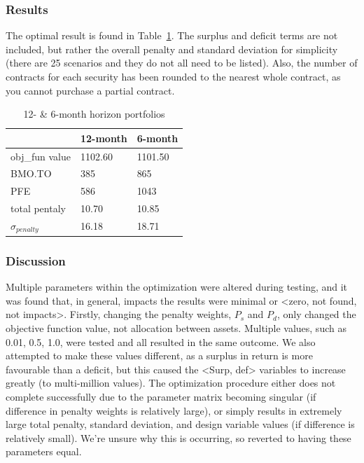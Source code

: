 \documentclass[12pt]{article}
\begin{document}
\subsubsection{Results}
The optimal result is found in Table~\ref{tab:result_pen}.
The surplus and deficit terms are not included, but rather the overall penalty and standard deviation for simplicity (there are 25 scenarios and they do not all need to be listed).
Also, the number of contracts for each security has been rounded to the nearest whole contract, as you cannot purchase a partial contract.

\begin{table}[H]
	\centering
    \begin{tabular}{|l|l|l|}
    \hline
    	~ & \textbf{12-month} & \textbf{6-month} \\ \hline
    	obj\_fun value & 1102.60 & 1101.50 \\ \hline
	BMO.TO & 385 & 865 \\ \hline
	PFE & 586 & 1043 \\ \hline
	total pentaly & 10.70 & 10.85 \\ \hline
	$\sigma_{penalty}$ & 16.18 & 18.71 \\ \hline
    \end{tabular}
    \caption {12- \& 6-month horizon portfolios}
    \label{tab:result_pen}
\end{table}

\subsubsection{Discussion}

Multiple parameters within the optimization were altered during testing, and it was found that, in general, impacts the results were minimal or <zero, not found, not impacts>. Firstly, changing the penalty weights, $P_s$ and $P_d$, only changed the objective function value, not allocation between assets. Multiple values, such as 0.01, 0.5, 1.0, were tested and all resulted in the same outcome. We also attempted to make these values different, as a surplus in return is more favourable than a deficit, but this caused the <Surp, def> variables to increase greatly (to multi-million values). The optimization procedure either does not complete successfully due to the parameter matrix becoming singular (if difference in penalty weights is relatively large), or simply results in extremely large total penalty, standard deviation, and design variable values (if difference is relatively small). We’re unsure why this is occurring, so reverted to having these parameters equal.
\end{document}
